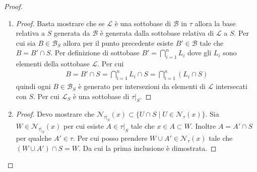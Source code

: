 \begin{proof}
\begin{enumerate}
\begin{proof}[Dimostrazione ridotta al banale]
	\end{proof}
	\item 
	\begin{proof}
		Basta mostrare che se $\mathcal{L}$ è una sottobase di $\mathcal{B}$ in $\tau$ allora la base relativa a $S$ generata da $\mathcal{B}$ è generata dalla sottobase relativa di $\mathcal{L}$ a $S$. Per cui sia $B \in \mathcal{B}_S$ allora per il punto precedente esiste $B' \in \mathcal{B}$ tale che $B = B' \cap S$. Per definizione di sottobase $B' = \bigcap^{n}_{i =1}L_i$ dove gli $L_i$ sono elementi della sottobase $\mathcal{L}$. Per cui
		\begin{equation}
		\begin{aligned}
			B = B' \cap S = \bigcap^n_{i=1} L_i \cap S = \bigcap^n_{i=1} (L_i \cap S)
 		\end{aligned}
		\end{equation} 
		quindi ogni $B \in \mathcal{B}_S$ è generato per intersezioni da elementi di $\mathcal{L}$ intersecati con $S$. Per cui $\mathcal{L}_S$ è una sottobase di $\tau|_S$. 
	\end{proof}
	\item 
	\begin{proof}
		Devo mostrare che $\mathcal{N}_{\tau|_S}(x) \subset \{ U \cap S \; | \; U \in \mathcal{N}_\tau(x) \}$. Sia $W \in \mathcal{N}_{\tau|_S}(x)$ per cui esiste $A \in \tau|_S$ tale che $x \in A \subset W$. Inoltre $A = A' \cap S$ per qualche $A' \in \tau$. Per cui posso prendere $W \cup A' \in \mathcal{N}_\tau(x)$ tale che $(W \cup A') \cap S = W$. Da cui la prima inclusione è dimostrata.
		

\end{proof}
\end{enumerate}
\end{proof}
